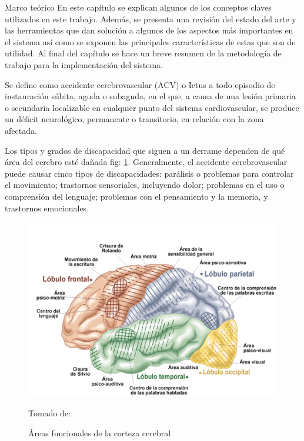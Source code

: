 \begin{thesischapter}{1} {Marco teórico}
    En este capítulo se explican algunos de los conceptos claves utilizados en este
    trabajo. Además, se presenta una revisión del estado del arte y las herramientas que
    dan solución a algunos de los aspectos más importantes en el sistema así como se exponen
    las principales características de estas que son de utilidad. Al final del capítulo se
    hace un breve resumen de la metodología de trabajo para la implementación del sistema.

    
    \vspace{10pt}
    Se define como accidente cerebrovascular (ACV) o Ictus a todo episodio de
    instauración súbita, aguda o subaguda, en el que, a causa de una lesión primaria o
    secundaria localizable en cualquier punto del sistema cardiovascular, se produce un
    déficit neurológico, permanente o transitorio, en relación con la zona afectada.~\cite{ictus}

    \vspace{10pt}
    Los tipos y grados de discapacidad que siguen a un derrame dependen de qué área
    del cerebro esté dañada fig: \ref{fig: cerebralcortex}. Generalmente, el accidente cerebrovascular puede
    causar cinco tipos de discapacidades: parálisis o problemas para controlar el movimiento;
    trastornos sensoriales, incluyendo dolor; problemas en el uso o comprensión del
    lenguaje; problemas con el pensamiento y la memoria, y trastornos emocionales.~\cite{post-strok} 
    \begin{figure}[ht]
        \centering
        \includegraphics[scale=0.5]{images/brain.jpg}
        \caption{Áreas funcionales de la corteza cerebral}
        Tomado de: ~\cite{areacereabral}
        \label{fig: cerebralcortex}
    \end{figure}


\end{thesischapter}
